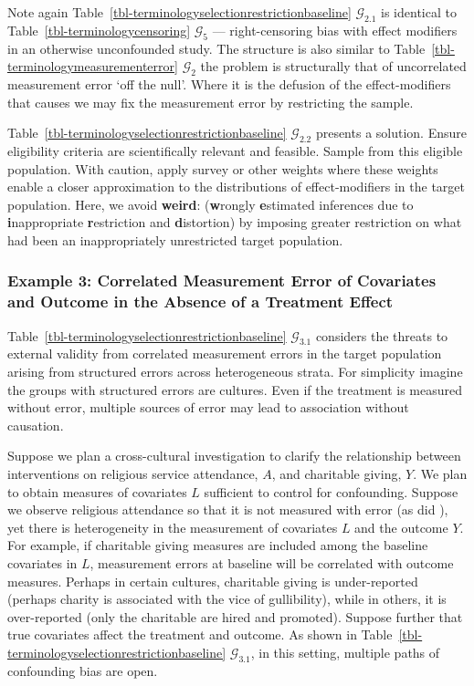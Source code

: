 \documentclass[
  single column]{article}
\begin{document}
Note again Table~\ref{tbl-terminologyselectionrestrictionbaseline}
\(\mathcal{G}_{2.1}\) is identical to
Table~\ref{tbl-terminologycensoring} \(\mathcal{G}_5\) ---
right-censoring bias with effect modifiers in an otherwise unconfounded
study. The structure is also similar to
Table~\ref{tbl-terminologymeasurementerror} \(\mathcal{G}_2\) the
problem is structurally that of uncorrelated measurement error `off the
null'. Where it is the defusion of the effect-modifiers that causes we
may fix the measurement error by restricting the sample.

Table~\ref{tbl-terminologyselectionrestrictionbaseline}
\(\mathcal{G}_{2.2}\) presents a solution. Ensure eligibility criteria
are scientifically relevant and feasible. Sample from this eligible
population. With caution, apply survey or other weights where these
weights enable a closer approximation to the distributions of
effect-modifiers in the target population. Here, we avoid
\textbf{weird}: (\textbf{w}rongly \textbf{e}stimated inferences due to
\textbf{i}nappropriate \textbf{r}estriction and \textbf{d}istortion) by
imposing greater restriction on what had been an inappropriately
unrestricted target population.

\subsubsection{Example 3: Correlated Measurement Error of Covariates and
Outcome in the Absence of a Treatment
Effect}\label{example-3-correlated-measurement-error-of-covariates-and-outcome-in-the-absence-of-a-treatment-effect}

Table~\ref{tbl-terminologyselectionrestrictionbaseline}
\(\mathcal{G}_{3.1}\) considers the threats to external validity from
correlated measurement errors in the target population arising from
structured errors across heterogeneous strata. For simplicity imagine
the groups with structured errors are cultures. Even if the treatment is
measured without error, multiple sources of error may lead to
association without causation.

Suppose we plan a cross-cultural investigation to clarify the
relationship between interventions on religious service attendance,
\(A\), and charitable giving, \(Y\). We plan to obtain measures of
covariates \(L\) sufficient to control for confounding. Suppose we
observe religious attendance so that it is not measured with error (as
did ), yet
there is heterogeneity in the measurement of covariates \(L\) and the
outcome \(Y\). For example, if charitable giving measures are included
among the baseline covariates in \(L\), measurement errors at baseline
will be correlated with outcome measures. Perhaps in certain cultures,
charitable giving is under-reported (perhaps charity is associated with
the vice of gullibility), while in others, it is over-reported (only the
charitable are hired and promoted). Suppose further that true covariates
affect the treatment and outcome. As shown in
Table~\ref{tbl-terminologyselectionrestrictionbaseline}
\(\mathcal{G}_{3.1}\), in this setting, multiple paths of confounding
bias are open.
\end{document}
